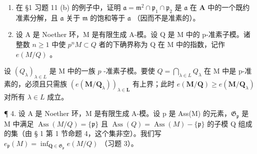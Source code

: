 \begin{enumerate}
\def\labelenumi{\arabic{enumi}.}
\setcounter{enumi}{1}
\item
  在 §1 习题 11 (b) 的例子中，证明 \(\mathfrak{a} = \mathfrak{m}^2 \cap \mathfrak{p}_1 \cap \mathfrak{p}_2\) 是 \(\mathfrak{a}\) 在 \(\mathbf{A}\) 中的一个既约准素分解，且 \(\mathfrak{a}\) 关于 \(\mathfrak{m}\) 的饱和等于 \(\mathfrak{a}\) （因而不是准素的）。
\item
  设 A 是 Noether 环，M 是有限生成 A-模。设 Q 是 M 中的 p-准素子模。诸整数 \(n \geqslant 1\) 中使 \(p^{n}M \subset Q\) 者的下确界称为 Q 在 M 中的指数，记作 \(e(M/Q)\) 。
\end{enumerate}

设 \((Q_{\lambda})_{\lambda \in L}\) 是 M 中的一族 \(p\) -准素子模。要使 \(Q = \bigcap_{\lambda \in L} Q_{\lambda}\) 在 M 中是 p-准素的，必须且只需族 \((e(\mathbf{M}/\mathbf{Q}_{\lambda}))_{\lambda\in\mathbf{L}}\) 有上界；此时 \(e(\mathbf{M}/\mathbf{Q})\geqslant e(\mathbf{M}/\mathbf{Q}_{\lambda})\) 对所有 \(\lambda\in L\) 成立。

¶ 4. 设 A 是 Noether 环，M 是有限生成 A-模。设 p 是 Ass(M) 的元素，\(\mathfrak{G}_{\mathfrak{p}}\) 是 M 中满足 \(\operatorname{Ass}(M/Q) = \{\mathfrak{p}\}\) 且 \(\operatorname{Ass}(Q) = \operatorname{Ass}(M) - \{\mathfrak{p}\}\) 的子模 Q 组成的集（由 § 1 第 1 节命题 4，这个集非空）。我们写 \(e_{\mathfrak{p}}(M) = \inf_{\mathbf{Q} \in \mathfrak{G}_{\mathfrak{p}}} e(M/Q)\) （习题 3）。


